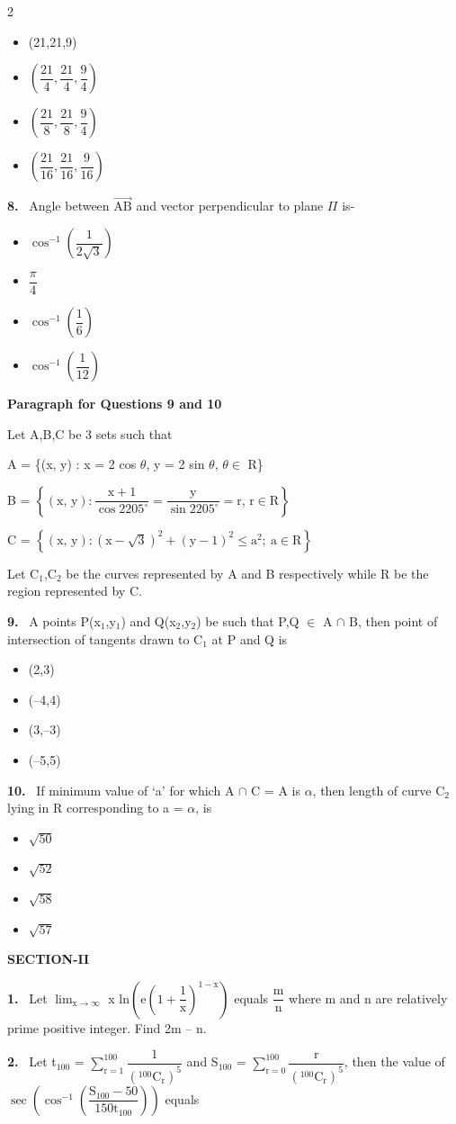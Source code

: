 \documentclass[10pt]{extarticle}
\newcommand{\sect}[1]{\par\smallskip\noindent\textbf{#1}\par}
\newcommand{\qn}[1]{\par\smallskip\noindent\textbf{#1.}~}
\newcommand{\paraq}[2]{\par\smallskip\noindent\textbf{Paragraph for Questions #1 and #2}\par}
\newenvironment{qoptions}{\begin{itemize}[leftmargin=1.8em,itemsep=1pt,topsep=2pt,label={}]}{\end{itemize}}
\newcommand{\opt}[2]{\item[(#1)] #2}
\begin{document}
\begin{multicols}{2}
\begin{qoptions}
\opt{A}{(21,21,9)}
\opt{B}{$\left(\dfrac{21}{4},\dfrac{21}{4},\dfrac{9}{4}\right)$}
\opt{C}{$\left(\dfrac{21}{8},\dfrac{21}{8},\dfrac{9}{4}\right)$}
\opt{D}{$\left(\dfrac{21}{16},\dfrac{21}{16},\dfrac{9}{16}\right)$}
\end{qoptions}
\qn{8} Angle between $\overrightarrow{\text{AB}}$ and vector perpendicular to plane $\Pi$ is-
\begin{qoptions}
\opt{A}{$\cos^{-1}\!\left(\dfrac{1}{2\sqrt{3}}\right)$}
\opt{B}{$\dfrac{\pi}{4}$}
\opt{C}{$\cos^{-1}\!\left(\dfrac{1}{6}\right)$}
\opt{D}{$\cos^{-1}\!\left(\dfrac{1}{12}\right)$}
\end{qoptions}
\paraq{9}{10}
Let A,B,C be 3 sets such that\par
A = \{(x, y) : x = 2 cos $\theta$, y = 2 sin $\theta$, $\theta\in$ R\}\par
B = $\left\{(\text{x, y}):\dfrac{\text{x}+1}{\cos 2205^\circ}=\dfrac{\text{y}}{\sin 2205^\circ}=\text{r, r}\in\text{R}\right\}$\par
C = $\left\{(\text{x, y}):\left(\text{x}-\sqrt{3}\right)^2+(\text{y}-1)^2\leqslant\text{a}^2;\ \text{a}\in\text{R}\right\}$\par
Let C$_1$,C$_2$ be the curves represented by A and B respectively while R be the region represented by C.\par
\qn{9} A points P(x$_1$,y$_1$) and Q(x$_2$,y$_2$) be such that P,Q $\in$ A $\cap$ B, then point of intersection of tangents drawn to C$_1$ at P and Q is
\begin{qoptions}
\opt{A}{(2,3)}
\opt{B}{(--4,4)}
\opt{C}{(3,--3)}
\opt{D}{(--5,5)}
\end{qoptions}
\qn{10} If minimum value of `a' for which A $\cap$ C = A is $\alpha$, then length of curve C$_2$ lying in R corresponding to a = $\alpha$, is
\begin{qoptions}
\opt{A}{$\sqrt{50}$}
\opt{B}{$\sqrt{52}$}
\opt{C}{$\sqrt{58}$}
\opt{D}{$\sqrt{57}$}
\end{qoptions}
\sect{SECTION-II}
\qn{1} Let $\displaystyle\lim_{\text{x}\to\infty}$ x ln$\left(\text{e}\left(1+\dfrac{1}{\text{x}}\right)^{1-\text{x}}\right)$ equals $\dfrac{\text{m}}{\text{n}}$ where m and n are relatively prime positive integer. Find 2m -- n.
\qn{2} Let t$_{100}$ = $\displaystyle\sum_{\text{r}=1}^{100}\dfrac{1}{\left({}^{100}\text{C}_\text{r}\right)^5}$ and S$_{100}$ = $\displaystyle\sum_{\text{r}=0}^{100}\dfrac{\text{r}}{\left({}^{100}\text{C}_\text{r}\right)^5}$, then the value of $\sec\!\left(\cos^{-1}\!\left(\dfrac{\text{S}_{100}-50}{150\text{t}_{100}}\right)\right)$ equals

\end{multicols}
\end{document}
